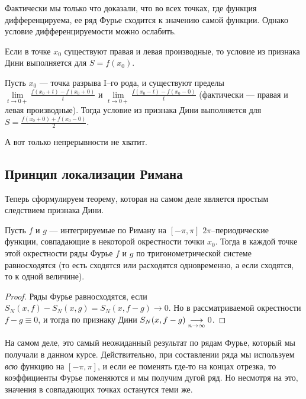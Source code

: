 Фактически мы только что доказали, что во всех точках, где функция дифференцируема, ее ряд Фурье сходится к значению самой функции. Однако условие дифференцируемости можно ослабить.
\begin{Comment}
Если в точке $x_0$ существуют правая и левая производные, то условие из признака Дини выполняется для $S = f(x_0)$.
\end{Comment}
\begin{Comment}
Пусть $x_0$ --- точка разрыва I--го рода, и существуют пределы $\lim\limits_{t \to 0+}\frac{f(x_0 + t) - f(x_0 + 0)}{t}$ и $\lim\limits_{t \to 0+} \frac{f(x_0-t) - f(x_0 - 0)}{t}$ (фактически --- правая и левая производные). Тогда условие из признака Дини выполняется для $S = \frac{f(x_0 + 0) + f(x_0 - 0)}{2}$.
\end{Comment}
А вот только непрерывности не хватит.

\subsection{Принцип локализации Римана}
Теперь сформулируем теорему, которая на самом деле является простым следствием признака Дини.

\begin{Theorem}
Пусть $f$ и $g$ --- интегрируемые по Риману на $[-\pi, \pi]$ $2\pi$--периодические функции, совпадающие в некоторой окрестности точки $x_0$. Тогда в каждой точке этой окрестности ряды Фурье $f$ и $g$ по тригонометрической системе равносходятся (то есть сходятся или расходятся одновременно, а если сходятся, то к одной величине).
\end{Theorem}
\begin{proof}
Ряды Фурье равносходятся, если $S_N(x, f) - S_N(x, g) = S_N(x, f - g) \to 0$. Но в рассматриваемой окрестности $f - g \equiv 0$, и тогда по признаку Дини $S_N(x, f - g) \underset{n\to \infty}{\longrightarrow} 0$.
\end{proof}

На самом деле, это самый неожиданный результат по рядам Фурье, который мы получали в данном курсе. Действительно, при составлении ряда мы используем \textit{всю} функцию на $[-\pi, \pi]$, и если ее поменять где-то на концах отрезка, то коэффициенты Фурье поменяются и мы получим дугой ряд. Но несмотря на это, значения в совпадающих точках останутся теми же.